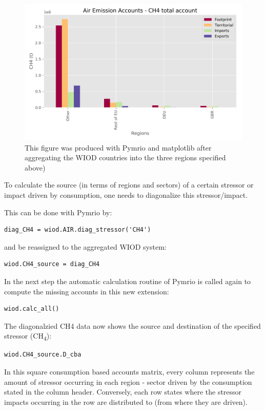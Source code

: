 \documentclass{jors}
\begin{document}
{  \begin{figure}[h!]
      \includegraphics[width=.9\textwidth]{./fig/airch4.png}
      \caption{
      This figure was produced with Pymrio and matplotlib after aggregating the WIOD countries into the three regions specified above)}
      \end{figure}



To calculate the source (in terms of regions and sectors) of a certain stressor or impact driven by consumption, one needs to diagonalize this stressor/impact. 

This can be done with Pymrio by:
\begin{lstlisting}
diag_CH4 = wiod.AIR.diag_stressor('CH4')
\end{lstlisting}

and be reassigned to the aggregated WIOD system:
\begin{lstlisting}
wiod.CH4_source = diag_CH4
\end{lstlisting}

In the next step the automatic calculation routine of Pymrio is called again to compute the missing accounts in this new extension:

\begin{lstlisting}
wiod.calc_all()
\end{lstlisting}

The diagonalzied CH4 data now shows the source and destination of the specified stressor (CH\textsubscript{4}):
\begin{lstlisting}
wiod.CH4_source.D_cba
\end{lstlisting}

In this square consumption based accounts matrix, every column represents the amount of stressor occurring in each region - sector driven by the consumption stated in the column header. Conversely, each row states where the stressor impacts occurring in the row are distributed to (from where they are driven).

}
\end{document}

